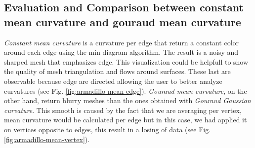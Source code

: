 \subsection{Evaluation and Comparison between constant mean curvature and gouraud mean curvature}
\textit{Constant mean curvature} is a curvature per
edge that return a constant color around each edge
using the min diagram algorithm. The result is a noisy and sharped mesh that emphasizes edge. This visualization could be helpfull to show the quality of mesh triangulation and flows around surfaces. These last are observable because edge are directed allowing the user to better analyze curvatures (see Fig. \ref{fig:armadillo-mean-edge}). \textit{Gouraud mean curvature}, on the other hand, return blurry meshes than the ones obtained with  \textit{Gouraud Gaussian curvature}. This smooth is caused by the fact that we are averaging per vertex, mean curvature would be calculated per edge but in this case, we had applied it on vertices opposite to edges, this result in a losing of data (see Fig. \ref{fig:armadillo-mean-vertex}).
